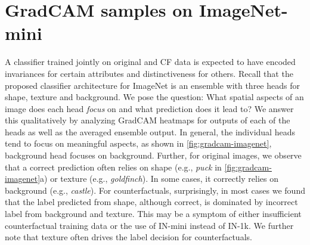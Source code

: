 \section{GradCAM samples on ImageNet-mini} \label{app:gradcam-additional}
A classifier trained jointly on original and CF data is expected to have encoded invariances for certain attributes and distinctiveness for others. Recall that the proposed classifier architecture for ImageNet is an ensemble with three heads for shape, texture and background. We pose the question: What spatial aspects of an image does each head \textit{focus} on and what prediction does it lead to? We answer this qualitatively by analyzing GradCAM heatmaps for outputs of each of the heads as well as the averaged ensemble output.
In general, the individual heads tend to focus on meaningful aspects, as shown in \cref{fig:gradcam-imagenet}, background head focuses on background.
Further, for original images, we observe that a correct prediction often relies on shape (e.g., \textit{puck} in \cref{fig:gradcam-imagenet}a) or texture (e.g., \textit{goldfinch}). In some cases, it correctly relies on  background (e.g., \textit{castle}).
For counterfactuals, surprisingly, in most cases we found that the label predicted from shape, although correct, is dominated by incorrect label from background and texture. This may be a symptom of either insufficient counterfactual training data or the use of IN-mini instead of IN-1k. We further note that texture often drives the label decision for counterfactuals.

